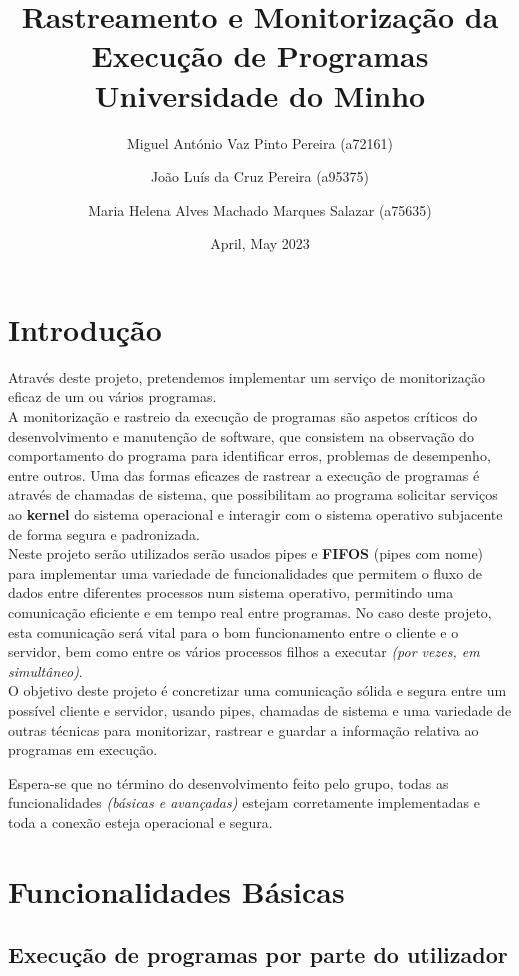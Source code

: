 \documentclass{report}
\title{Rastreamento e Monitorização da Execução de Programas\\
\Large Universidade do Minho}
\author{Miguel António Vaz Pinto Pereira (a72161) \and
João Luís da Cruz Pereira (a95375) \and
Maria Helena Alves Machado Marques Salazar (a75635)\\}
\date{April, May 2023}
\begin{document}

\maketitle
\tableofcontents
\newpage
\section{Introdução}
Através deste projeto, pretendemos implementar um serviço de monitorização eficaz de um ou vários programas.\\

A monitorização e rastreio da execução de programas são aspetos críticos do desenvolvimento e manutenção de software, que consistem na observação do comportamento do programa para identificar erros, problemas de desempenho, entre outros. Uma das formas eficazes de rastrear a execução de programas é através de chamadas de sistema, que possibilitam ao programa solicitar serviços ao \textbf{kernel} do sistema operacional e interagir com o sistema operativo subjacente de forma segura e padronizada.\\

Neste projeto serão utilizados serão usados pipes e \textbf{FIFOS} (pipes com nome) para implementar uma variedade de funcionalidades que permitem o fluxo de dados entre diferentes processos num sistema operativo, permitindo uma comunicação eficiente e em tempo real entre programas. No caso deste projeto, esta comunicação será vital para o bom funcionamento entre o cliente e o servidor, bem como entre os vários processos filhos a executar \textit{(por vezes, em simultâneo)}.\\

O objetivo deste projeto é concretizar uma comunicação sólida e segura entre um possível cliente e servidor, usando pipes, chamadas de sistema e uma variedade de outras técnicas para monitorizar, rastrear e guardar a informação relativa ao programas em execução.\par 
Espera-se que no término do desenvolvimento feito pelo grupo, todas as funcionalidades \textit{(básicas e avançadas)} estejam corretamente implementadas e toda a conexão esteja operacional e segura.

\newpage
\section{Funcionalidades Básicas}
\subsection{Execução de programas por parte do utilizador}
\end{document}
